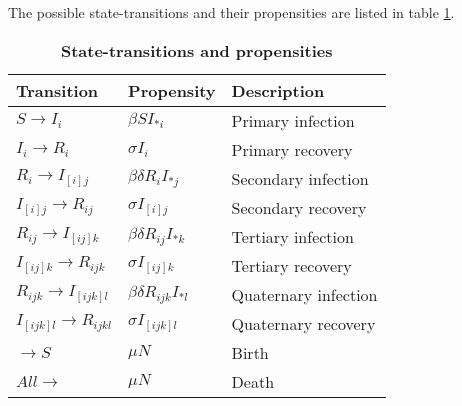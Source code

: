 \documentclass[12pt]{article}
\begin{document}
The possible state-transitions and their  propensities are listed in table 
\ref{tab:trans}.
\begin{table}
\caption{
\bf{State-transitions and propensities}}
\label{tab:trans}
\begin{center}
\begin{tabular}[c]{l|l|l}
\hline
Transition & Propensity & Description\\
\hline
$S \rightarrow I_i$ & $\beta S I_{*i}$ & Primary infection \\
$I_i \rightarrow R_i$ & $\sigma I_i$ & Primary recovery\\
$R_i \rightarrow I_{[i]j}$ & $\beta \delta R_i I_{*j}$ & Secondary infection\\
$I_{[i]j} \rightarrow R_{ij}$ & $\sigma I_{[i]j}$ & Secondary recovery\\
$R_{ij} \rightarrow I_{[ij]k}$ & $\beta \delta R_{ij} I_{*k}$ & Tertiary 
infection\\
$I_{[ij]k} \rightarrow R_{ijk}$ & $\sigma I_{[ij]k}$ & Tertiary recovery\\
$R_{ijk} \rightarrow I_{[ijk]l}$ & $\beta \delta R_{ijk} I_{*l}$ & Quaternary 
infection\\
$I_{[ijk]l} \rightarrow R_{ijkl}$ & $\sigma I_{[ijk]l}$ & Quaternary recovery\\
$\rightarrow S$ & $\mu N$ & Birth\\
$All \rightarrow$ & $\mu N$ & Death\\
\hline
\end{tabular}
\end{center}

\end{table}



\end{document}
